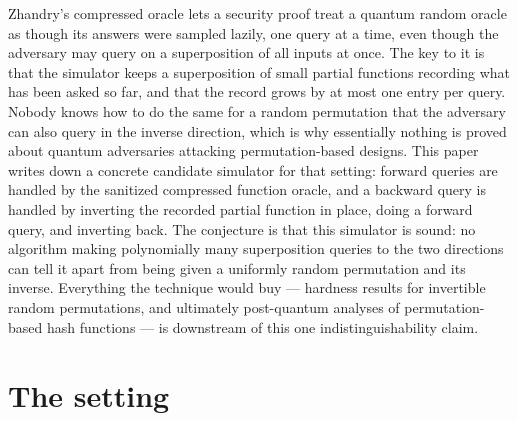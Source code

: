 \documentclass{aicr-conjecture}
\begin{document}

\vspace{0.4em}

\begin{informalconjecture}
Zhandry's compressed oracle lets a security proof treat a quantum
random oracle as though its answers were sampled lazily, one query at a
time, even though the adversary may query on a superposition of all
inputs at once. The key to it is that the simulator keeps a
superposition of small partial functions recording what has been asked
so far, and that the record grows by at most one entry per query.
Nobody knows how to do the same for a random permutation that the
adversary can also query in the inverse direction, which is why
essentially nothing is proved about quantum adversaries attacking
permutation-based designs. This paper writes down a concrete candidate
simulator for that setting: forward queries are handled by the
sanitized compressed function oracle, and a backward query is handled
by inverting the recorded partial function in place, doing a forward
query, and inverting back. The conjecture is that this simulator is
sound: no algorithm making polynomially many superposition queries to
the two directions can tell it apart from being given a uniformly
random permutation and its inverse. Everything the technique would buy
--- hardness results for invertible random permutations, and ultimately
post-quantum analyses of permutation-based hash functions --- is
downstream of this one indistinguishability claim.
\end{informalconjecture}

\section{The setting}\label{sec:setting}
\end{document}
